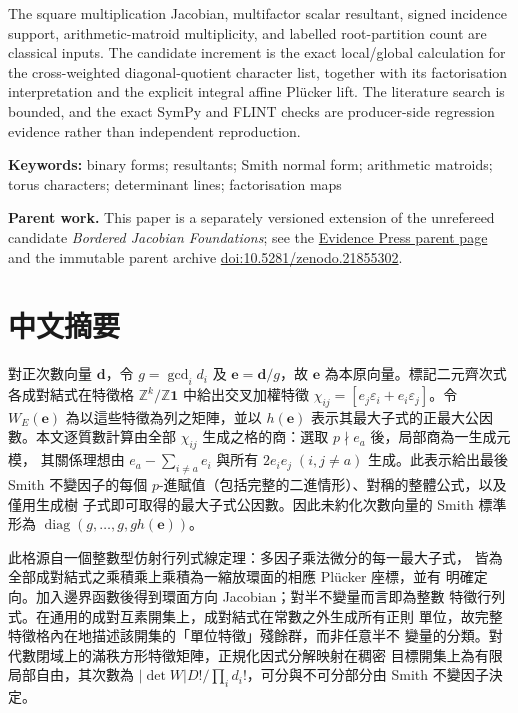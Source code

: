 \documentclass[
  11pt,
  a4paper,
]{article}
\begin{document}
The square multiplication Jacobian, multifactor scalar resultant, signed
incidence support, arithmetic-matroid multiplicity, and labelled
root-partition count are classical inputs. The candidate increment is
the exact local/global calculation for the cross-weighted
diagonal-quotient character list, together with its factorisation
interpretation and the explicit integral affine Plücker lift. The
literature search is bounded, and the exact SymPy and FLINT checks are
producer-side regression evidence rather than independent reproduction.

\textbf{Keywords:} binary forms; resultants; Smith normal form;
arithmetic matroids; torus characters; determinant lines; factorisation
maps

\textbf{Parent work.} This paper is a separately versioned extension of
the unrefereed candidate \emph{Bordered Jacobian Foundations}; see the
\href{https://evidencepress.org/releases/bordered-jacobian-foundations/}{Evidence
Press parent page} and the immutable parent archive
\href{https://doi.org/10.5281/zenodo.21855302}{doi:10.5281/zenodo.21855302}.

\section{中文摘要}\label{ux4e2dux6587ux6458ux8981}

對正次數向量 \(\mathbf d\)，令 \(g=\gcd_i d_i\) 及
\(\mathbf e=\mathbf d/g\)，故 \(\mathbf e\)
為本原向量。標記二元齊次式各成對結式在特徵格
\(\mathbb Z^k/\mathbb Z\mathbf1\) 中給出交叉加權特徵
\(\chi_{ij}=[e_j\varepsilon_i+e_i\varepsilon_j]\)。令 \(W_E(\mathbf e)\)
為以這些特徵為列之矩陣，並以 \(h(\mathbf e)\)
表示其最大子式的正最大公因數。本文逐質數計算由全部 \(\chi_{ij}\)
生成之格的商：選取 \(p\nmid e_a\) 後，局部商為一生成元模， 其關係理想由
\(e_a-\sum_{i\ne a}e_i\) 與所有 \(2e_ie_j\;(i,j\ne a)\)
生成。此表示給出最後 Smith 不變因子的每個
\(p\)-進賦值（包括完整的二進情形）、對稱的整體公式，以及僅用生成樹
子式即可取得的最大子式公因數。因此未約化次數向量的 Smith 標準形為
\(\operatorname{diag}(g,\ldots,g,gh(\mathbf e))\)。

此格源自一個整數型仿射行列式線定理：多因子乘法微分的每一最大子式，
皆為全部成對結式之乘積乘上乘積為一縮放環面的相應 Plücker 座標，並有
明確定向。加入邊界函數後得到環面方向 Jacobian；對半不變量而言即為整數
特徵行列式。在通用的成對互素開集上，成對結式在常數之外生成所有正則
單位，故完整特徵格內在地描述該開集的「單位特徵」殘餘群，而非任意半不
變量的分類。對代數閉域上的滿秩方形特徵矩陣，正規化因式分解映射在稠密
目標開集上為有限局部自由，其次數為
\(|\det W|D!/\prod_i d_i!\)，可分與不可分部分由 Smith 不變因子決定。
\end{document}
